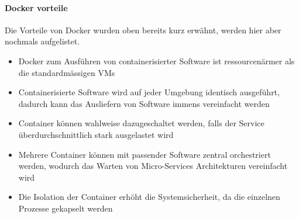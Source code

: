 \paragraph{Docker vorteile}
Die Vorteile von Docker wurden oben bereits kurz erwähnt, werden hier aber nochmals aufgelistet.
\begin{itemize}
	\item Docker zum Ausführen von containerisierter Software ist ressourcenärmer als die standardmässigen VMs
	\item Containerisierte Software wird auf jeder Umgebung identisch ausgeführt, dadurch kann das Ausliefern von Software immens vereinfacht werden
	\item Container können wahlweise dazugeschaltet werden, falls der Service überdurchschnittlich stark ausgelastet wird
	\item Mehrere Container können mit passender Software zentral orchestriert werden, wodurch das Warten von Micro-Services Architekturen vereinfacht wird
	\item Die Isolation der Container erhöht die Systemsicherheit, da die einzelnen Prozesse gekapselt werden
\end{itemize}
